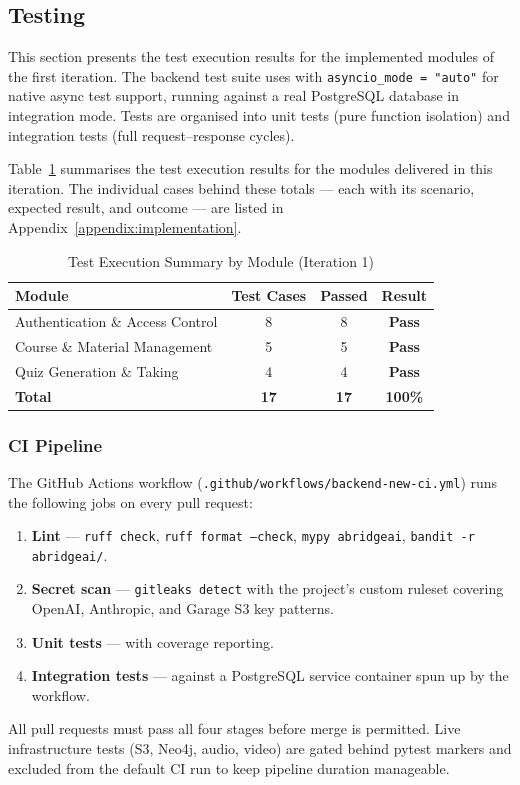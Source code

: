 ﻿\subsection{Testing}
\label{sec:impl_testing}

This section presents the test execution results for the implemented modules of the first iteration. The backend test suite uses  with \texttt{asyncio\_mode = "auto"} for native async test support, running against a real PostgreSQL database in integration mode. Tests are organised into unit tests (pure function isolation) and integration tests (full request--response cycles).

Table~\ref{tab:test_result_summary} summarises the test execution results for the modules delivered in this iteration. The individual cases behind these totals --- each with its scenario, expected result, and outcome --- are listed in Appendix~\ref{appendix:implementation}.

\begin{table}[htbp]
\centering
\caption{Test Execution Summary by Module (Iteration 1)}
\label{tab:test_result_summary}
\renewcommand{\arraystretch}{1.3}
\begin{tabular}{|l|c|c|c|}
\hline
\textbf{Module} & \textbf{Test Cases} & \textbf{Passed} & \textbf{Result} \\
\hline
Authentication \& Access Control & 8 & 8 & \textbf{Pass} \\
Course \& Material Management    & 5 & 5 & \textbf{Pass} \\
Quiz Generation \& Taking        & 4 & 4 & \textbf{Pass} \\
\hline
\textbf{Total}                   & \textbf{17} & \textbf{17} & \textbf{100\%} \\
\hline
\end{tabular}
\end{table}

\subsubsection{CI Pipeline}
\label{sec:impl_ci}

The GitHub Actions workflow (\texttt{.github/workflows/backend-new-ci.yml}) runs the following jobs on every pull request:

\begin{enumerate}
    \item \textbf{Lint} — \texttt{ruff check}, \texttt{ruff format --check}, \texttt{mypy abridgeai}, \texttt{bandit -r abridgeai/}.
    \item \textbf{Secret scan} — \texttt{gitleaks detect} with the project's custom ruleset covering OpenAI, Anthropic, and Garage S3 key patterns.
    \item \textbf{Unit tests} —  with coverage reporting.
    \item \textbf{Integration tests} —  against a PostgreSQL service container spun up by the workflow.
\end{enumerate}

All pull requests must pass all four stages before merge is permitted. Live infrastructure tests (S3, Neo4j, audio, video) are gated behind pytest markers and excluded from the default CI run to keep pipeline duration manageable.
